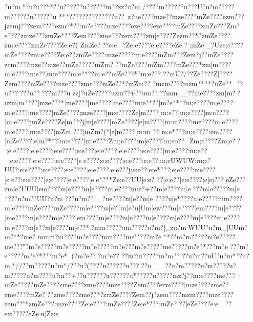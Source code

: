 {{{{{{{{{{{{{{{{{{{{{{{{{{{{{{{{{{{{{{{{{{{{{{{{{{{{{{{{{{{{{{{{{{{{{{{{{{{{{{{{{{{{{{{{{{{{{{{{{{{{{{{{{{{{{{{{{{{{{{{{{{{{{{{{{{{{{{{{{{{{{{{{{{{{{{{{{{{{{{{{{{{{{{{{{{{{{{{{{{{{{{{{{{{{{{{{{{{{{{{{{{{{{{{{{{{{{{{{{{{{{{{{{{{{{{{{{{{{{{{{{{{{{{{{{{{{{{{{{{{{{{{{{{{{{{{{{{{{{{{{{{{{{{{{{{{{{{{{{{{{{{{{{{{{{{{{{{{{{{{{{{{{{{{{{{{{{{{{{{{{{{{{{{{{{{{{{{{{{{{{{{{{{{{{{{{{{{{{?u?m  *?u?u??**?}?u?????}?u?????}?m??zz?u?m
/???}?m?????}?u???U?u?m ????}?m?????}?u?????}?u
***???}?????}?????}?u??~z?u{e????{mze??{mze????{mZe????{ezm???jze{mj???ze{m????{ezm?*??:m?e????{mze????{eze????{eze????{mZe????zmZe???Zm?e????zmze???zmZe*???Ze{m????zm{e???ze{m????zm[e????Zezm??*?zmZe????zm:e????zmZe????Ze;e?(  ZmZe???{e:e?Ze:e?/??{e:e????{eZe?{;mZe_?Uze;e????{mZe????zm:e????Ze;e  ??zmZe????:mze?????m:e????{mZm???Ze{m?j??{mZe????ze{m????{mze??{mze??{mZe?????mZm???{mZe????{mZm????{mZe???*zm[m????{m[e????{m:e??[m:e????{m:e?*??{m:e??{mZe???*?m:e?????{mU?/??Ze??? ?Z]????Ze{m????{mZe????{mze????zm{e???{mZe??*?{mZm?? ?{mzm????{mzm****?uZe**
??u??????u?? ???}m{???uzzj?uZe?????uzm??+??u{m????m{m__??{m{e????zm[m??uzm[m????[mze???*[m{e????[m{e????[m{e????{m:e?*??[m?e***?{m;e????{m;e????{m:e????:m{e????[mZe????;mze????[m:e????Ze[m????[m:e??[m;e????[m:e????[m:e????;mZe????Ze[m???j[m[e????[mZe????[e[m????[m:m????:m{e????{m[e????{m:e????[m;e????[mZm
???[mZm ?(*[e[m????[m:m
??
{m:e*???{m;e????:e{m????[mZe????;e[m?**?[m:e????[m:e????Zm;e????:m[e????[m;eo??_Zm;e????Zm;e??;ee????;e:e????;e:e????;e:e???;e:e????;e:e????;e:e????[m;e????:m;e??;e:e????;e:e????;e:e????[ee????;e:e????;e:e???;e:e??;m;eUWUW;m;e?UU?;e:e????;e:e????;e:e????;e:e????:e;e???j;e:e??:e;e*???:e;e????;e:e????[ee??;e:e????[e;e????[ee????[ee*?**Ze;e??UU[e:e? ??[e:e??[e:e????;e[ej???[eZe??? zm[e?UUU[e{m????{m[e????{m[e????{m;e????{m:e?+??{m[e????{m[e ???m[e?????m[e
*???u?m??UU?u?m ???u?m??~_?u{e????{m[e  ??m[e ????u[e*????u[e?????m{m????{m[e????{mZe????{mZe????{m[e????{m[e?]]}{m[e?u]U{m[ew???{m[e????[e{m????{m[e????[m{e????{m[e????{m[e????[e{m????{m[e????{m[e????{m[e????{m[e????{m[e????{m[e????{m[e????{m[e??{m[e????{m[e??*?m{m?????u{m?????u?m ?|_zu?mWUU?u?m_]UU{m?m?**?{m{e?   {m{m    {m?m????{m?e????m{m????{m{e""???m?e**??m?m?????m?e?????m{e???"?m?e?????m?e?????m?e?????m?e???m?e?????m{e?????m?e?*???m?e 
???m?e?????m?e?*???m?e*
(?m?e? ??m?e?? ??m?m?????m?m????u?m??uU?u?m*?}?u?m*//?}?m?????u?m*/???u?}( ???}?u?????}?u????}?u__~??u?m?????u?m?????u?m?????u?m????u?m??+?}?u??????u??????u*?????u????}?mz?j??m:e????{m{e???mZe?????mZe????zm{e????zm{e????{mze????Ze{m????{ezm????[mze????zm{e??zm{e????{mZe???zm{e????zm{e??*?zmZe????Ze{m??j?ze{m????{mzm????{mze????ze{m??"*zmZe???:mze????Ze;e????:mZe????Ze;e*???:mZe???[eZe????{e:e_??{e:e?????eZeu]}Ze:e
}}}}}}}}}}}}}}}}}}}}}}}}}}}}}}}}}}}}}}}}}}}}}}}}}}}}}}}}}}}}}}}}}}}}}}}}}}}}}}}}}}}}}}}}}}}}}}}}}}}}}}}}}}}}}}}}}}}}}}}}}}}}}}}}}}}}}}}}}}}}}}}}}}}}}}}}}}}}}}}}}}}}}}}}}}}}}}}}}}}}}}}}}}}}}}}}}}}}}}}}}}}}}}}}}}}}}}}}}}}}}}}}}}}}}}}}}}}}}}}}}}}}}}}}}}}}}}}}}}}}}}}}}}}}}}}}}}}}}}}}}}}}}}}}}}}}}}}}}}}}}}}}}}}}}}}}}}}}}}}}}}}}}}}}}}}}}}}}}}}}}}}}}}}}}}}}}}}}}}}}}}}}}}}}}}}}}}}}}}}}}}}}}}}}}}}}}}}}}}}}}}}}}}}}}}}}}}}}}}}}}}}}}}}}}}}}}}}}}}}}}}}}}}}}}}}}}}}}}}}}}}}}}}}}}}}}}}}}}}}}}}}}
